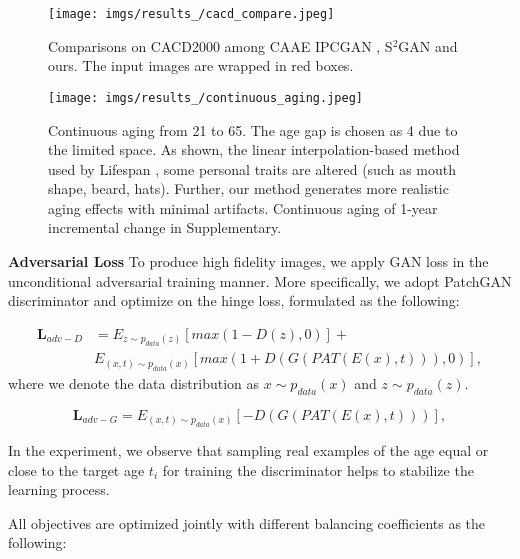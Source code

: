 \documentclass[final]{cvpr}
\begin{document}
\begin{figure*}[t!]
\centering
	\vspace{-0.3cm}
    \texttt{[image: imgs/results\_/cacd\_compare.jpeg]}
    \caption{Comparisons on CACD2000 \cite{chen2014cross} among CAAE\cite{zhang2017age} IPCGAN \cite{wang2018face}, S\(^2\)GAN \cite{he2019s2gan} and ours. The input images are wrapped in red boxes.}
    \label{cacd_img}
    \vspace{-0.2cm}
\end{figure*}


\begin{figure*}[t!]
    \centering
    \texttt{[image: imgs/results\_/continuous\_aging.jpeg]}
    \caption{Continuous aging from 21 to 65. The age gap is chosen as 4 due to the limited space. As shown, the linear interpolation-based method used by Lifespan \cite{orel2020lifespan}, some personal traits are altered (such as mouth shape, beard, hats). Further, our method generates more realistic aging effects with minimal artifacts. Continuous aging of 1-year incremental change in Supplementary.}
    \label{continuous_img}
\end{figure*}
\textbf{Adversarial Loss}
To produce high fidelity images, we apply GAN loss in the unconditional adversarial training manner. More specifically, we adopt PatchGAN \cite{pix2pix2017} discriminator and optimize on the hinge loss, formulated as the following:

\begin{equation}
\begin{split}
\mathbf{L}_{adv-D} &= E_{z \sim p_{data}(z)}[max(1 - D(z), 0)] + \\
                                    &E_{(x,t) \sim p_{data}(x)}[max(1 + D(G(PAT(E(x), t))), 0)],
\label{adv_d_loss}
\end{split}
\end{equation}
where we denote the data distribution as $x \sim p_{data}(x)$ and $z \sim p_{data}(z)$. 

\begin{equation}
\mathbf{L}_{adv-G} = E_{(x,t) \sim p_{data}(x)}[-D(G(PAT(E(x), t)))],
\label{adv_g_loss}
\end{equation}

In the experiment, we observe that sampling real examples of the age equal or close to the target age \(t_i\) for training the discriminator helps to stabilize the learning process. 

All objectives are optimized jointly with different balancing coefficients as the following:
\end{document}

